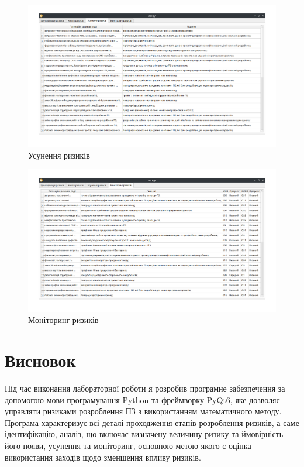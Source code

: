 \documentclass[14pt]{extreport}
\begin{document}
\begin{normalsize}
	\begin{figure}[H]
		\centering
		\includegraphics[scale=0.45]{5}
		\caption{Усунення ризиків}
	\end{figure}
	
	\begin{figure}[H]
		\centering
		\includegraphics[scale=0.45]{6}
		\caption{Моніторинг ризиків}
	\end{figure}
	
	\section*{Висновок}
	Під час виконання лабораторної роботи я розробив програмне забезпечення за допомогою мови програмування Python та фреймворку PyQt6, яке дозволяє управляти ризиками розроблення ПЗ з використанням математичного методу. Програма характеризує всі деталі проходження етапів розроблення ризиків, а саме ідентифікацію, аналіз, що включає визначену величину ризику та ймовірність його появи, усунення та моніторинг, основною метою якого є оцінка використання заходів щодо зменшення впливу ризиків.
	
\end{normalsize}
\end{document}

